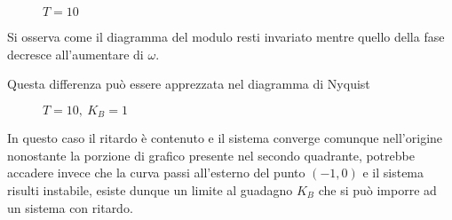 \def\T{10} %

\begin{figure}[h]
\centering
{}
\caption{$T = \T $}
\end{figure}

Si osserva come il diagramma del modulo resti invariato mentre quello della
fase decresce all'aumentare di $\omega$.

\newpage
Questa differenza può essere apprezzata nel diagramma di Nyquist

\begin{figure}[h]
\centering
{}
\caption{$T=\T,\ K_B=1$}
\end{figure}

In questo caso il ritardo è contenuto e il sistema converge comunque
nell'origine nonostante la porzione di grafico presente nel secondo quadrante,
potrebbe accadere invece che la curva passi all'esterno del punto $(-1,0)$ e il
sistema risulti instabile, esiste dunque un limite al guadagno $K_B$ che si può
imporre ad un sistema con ritardo.

